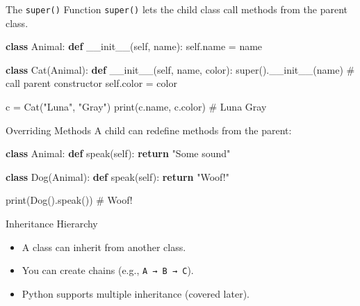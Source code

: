 \documentclass[
  letterpaper,
  DIV=11,
  numbers=noendperiod]{scrreprt}
\newenvironment{Shaded}{\begin{snugshade}}{\end{snugshade}}
\newcommand{\BuiltInTok}[1]{\textcolor[rgb]{0.00,0.23,0.31}{#1}}
\newcommand{\CommentTok}[1]{\textcolor[rgb]{0.37,0.37,0.37}{#1}}
\newcommand{\ControlFlowTok}[1]{\textcolor[rgb]{0.00,0.23,0.31}{\textbf{#1}}}
\newcommand{\FunctionTok}[1]{\textcolor[rgb]{0.28,0.35,0.67}{#1}}
\newcommand{\KeywordTok}[1]{\textcolor[rgb]{0.00,0.23,0.31}{\textbf{#1}}}
\newcommand{\NormalTok}[1]{\textcolor[rgb]{0.00,0.23,0.31}{#1}}
\newcommand{\OperatorTok}[1]{\textcolor[rgb]{0.37,0.37,0.37}{#1}}
\newcommand{\StringTok}[1]{\textcolor[rgb]{0.13,0.47,0.30}{#1}}
\newcommand{\VariableTok}[1]{\textcolor[rgb]{0.07,0.07,0.07}{#1}}
\providecommand{\tightlist}{%
  \setlength{\itemsep}{0pt}\setlength{\parskip}{0pt}}
\begin{document}
The \texttt{super()} Function \texttt{super()} lets the child class call
methods from the parent class.

\begin{Shaded}
\begin{Highlighting}[]
\KeywordTok{class}\NormalTok{ Animal:}
    \KeywordTok{def} \FunctionTok{\_\_init\_\_}\NormalTok{(}\VariableTok{self}\NormalTok{, name):}
        \VariableTok{self}\NormalTok{.name }\OperatorTok{=}\NormalTok{ name}

\KeywordTok{class}\NormalTok{ Cat(Animal):}
    \KeywordTok{def} \FunctionTok{\_\_init\_\_}\NormalTok{(}\VariableTok{self}\NormalTok{, name, color):}
        \BuiltInTok{super}\NormalTok{().}\FunctionTok{\_\_init\_\_}\NormalTok{(name)   }\CommentTok{\# call parent constructor}
        \VariableTok{self}\NormalTok{.color }\OperatorTok{=}\NormalTok{ color}
\end{Highlighting}
\end{Shaded}

\begin{Shaded}
\begin{Highlighting}[]
\NormalTok{c }\OperatorTok{=}\NormalTok{ Cat(}\StringTok{"Luna"}\NormalTok{, }\StringTok{"Gray"}\NormalTok{)}
\BuiltInTok{print}\NormalTok{(c.name, c.color)   }\CommentTok{\# Luna Gray}
\end{Highlighting}
\end{Shaded}

Overriding Methods A child can redefine methods from the parent:

\begin{Shaded}
\begin{Highlighting}[]
\KeywordTok{class}\NormalTok{ Animal:}
    \KeywordTok{def}\NormalTok{ speak(}\VariableTok{self}\NormalTok{):}
        \ControlFlowTok{return} \StringTok{"Some sound"}

\KeywordTok{class}\NormalTok{ Dog(Animal):}
    \KeywordTok{def}\NormalTok{ speak(}\VariableTok{self}\NormalTok{):}
        \ControlFlowTok{return} \StringTok{"Woof!"}

\BuiltInTok{print}\NormalTok{(Dog().speak())   }\CommentTok{\# Woof!}
\end{Highlighting}
\end{Shaded}

Inheritance Hierarchy

\begin{itemize}
\tightlist
\item
  A class can inherit from another class.
\item
  You can create chains (e.g., \texttt{A\ →\ B\ →\ C}).
\item
  Python supports multiple inheritance (covered later).
\end{itemize}
\end{document}
